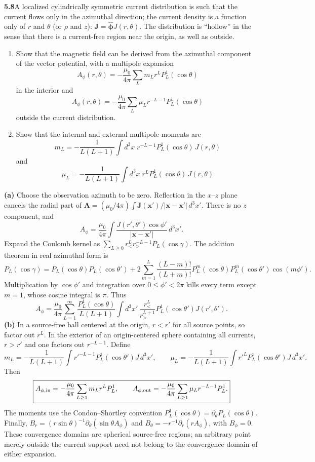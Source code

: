 \par\bigskip
\noindent\textbf{5.8}\quad A localized cylindrically symmetric current distribution is such that the current flows only in the azimuthal direction; the current density is a function only of $r$ and $\theta$ (or $\rho$ and $z$): $\mathbf{J}=\hat{\boldsymbol{\phi}}J(r,\theta)$. The distribution is ``hollow'' in the sense that there is a current-free region near the origin, as well as outside.
\begin{enumerate}
\item[(a)] Show that the magnetic field can be derived from the azimuthal component of the vector potential, with a multipole expansion
\[
A_{\phi}(r,\theta)=-\frac{\mu_{0}}{4\pi}\sum_{L}m_{L}r^{L}P_{L}^{1}(\cos\theta)
\]
in the interior and
\[
A_{\phi}(r,\theta)=-\frac{\mu_{0}}{4\pi}\sum_{L}\mu_{L}r^{-L-1}P_{L}^{1}(\cos\theta)
\]
outside the current distribution.
\item[(b)] Show that the internal and external multipole moments are
\[
m_{L}=-\frac{1}{L(L+1)}\int d^{3}x\;r^{-L-1}P_{L}^{1}(\cos\theta)\,J(r,\theta)
\]
and
\[
\mu_{L}=-\frac{1}{L(L+1)}\int d^{3}x\;r^{L}P_{L}^{1}(\cos\theta)\,J(r,\theta)
\]
\end{enumerate}
\solution
\textbf{(a)} Choose the observation azimuth to be zero. Reflection in the
$x$--$z$ plane cancels the radial part of
$\mathbf A=(\mu_0/4\pi)\int\mathbf J(\mathbf x')/|\mathbf x-\mathbf x'|\,d^3x'$.
There is no $z$ component, and
\[
A_\phi=\frac{\mu_0}{4\pi}\int
\frac{J(r',\theta')\cos\phi'}{|\mathbf x-\mathbf x'|}\,d^3x'.
\]
Expand the Coulomb kernel as
$\sum_{L\ge0}r_<^Lr_>^{-L-1}P_L(\cos\gamma)$.
The addition theorem in real azimuthal form is
\[
P_L(\cos\gamma)=P_L(\cos\theta)P_L(\cos\theta')
+2\sum_{m=1}^L\frac{(L-m)!}{(L+m)!}
P_L^m(\cos\theta)P_L^m(\cos\theta')\cos(m\phi').
\]
Multiplication by $\cos\phi'$ and integration over $0\le\phi'<2\pi$
kills every term except $m=1$, whose cosine integral is $\pi$.
Thus
\[
A_\phi=\frac{\mu_0}{4\pi}\sum_{L=1}^\infty
\frac{P_L^1(\cos\theta)}{L(L+1)}
\int d^3x'\,\frac{r_<^L}{r_>^{L+1}}
P_L^1(\cos\theta')J(r',\theta').
\]
\textbf{(b)} In a source-free ball centered at the origin, $r<r'$ for
all source points, so factor out $r^L$. In the exterior of an
origin-centered sphere containing all currents, $r>r'$ and one factors
out $r^{-L-1}$.
Define
\[
\boxed{m_L=-\frac1{L(L+1)}\int r'^{-L-1}P_L^1(\cos\theta')J\,d^3x',
\qquad
\mu_L=-\frac1{L(L+1)}\int r'^LP_L^1(\cos\theta')J\,d^3x'.}
\]
Then
\[
\boxed{A_{\phi,\rm in}=-\frac{\mu_0}{4\pi}\sum_{L\ge1}m_Lr^LP_L^1,
\qquad
A_{\phi,\rm out}=-\frac{\mu_0}{4\pi}\sum_{L\ge1}\mu_Lr^{-L-1}P_L^1.}
\]
The moments use the Condon--Shortley convention
$P_L^1(\cos\theta)=\partial_\theta P_L(\cos\theta)$.
Finally,
$B_r=(r\sin\theta)^{-1}\partial_\theta(\sin\theta A_\phi)$ and
$B_\theta=-r^{-1}\partial_r(rA_\phi)$, with $B_\phi=0$.
These convergence domains are spherical source-free regions; an
arbitrary point merely outside the current support need not belong to
the convergence domain of either expansion.


